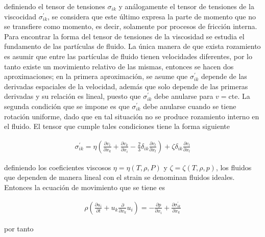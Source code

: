 \noindent definiendo el tensor de tensiones $\sigma_{ik} $ y análogamente el tensor de tensiones de la viscocidad $\sigma^{'}_{ik}$, se considera que este último expresa la parte de momento que no se transfiere como momento, es decir, solamente por procesos de fricción interna. Para encontrar la forma del tensor de tensiones de la viscosidad se estudia el fundamento de las partículas de fluido. La única manera de que exista rozamiento es asumir que entre las partículas de fluido tienen velocidades diferentes, por lo tanto existe un movimiento relativo de las mismas, entonces se hacen dos aproximaciones; en la primera aproximación, se asume que $\sigma^{'}_{ik}$ depende de las derivadas espaciales de la velocidad, además que solo depende de las primeras derivadas y su relación es lineal, puesto que $\sigma^{'}_{ik}$ debe anularse para $v = \text{cte}$. La segunda condición que se impone es que $\sigma^{'}_{ik}$ debe anularse cuando se tiene rotación uniforme, dado que en tal situación no se produce rozamiento interno en el fluido. El tensor que cumple tales condiciones tiene la forma siguiente

\begin{eqnarray}
\sigma^{'}_{ik} = \eta\left(\frac{\partial v_{i}}{\partial x_{k}} + \frac{\partial v_{k}}{\partial x_{i}} - \frac{2}{3}\delta_{ik}\frac{\partial v_{l}}{\partial x_{l}}\right) + \zeta\delta_{ik}\frac{\partial v_{l}}{\partial x_{l}}
\end{eqnarray}

\noindent  definiendo los coeficientes viscosos $\eta = \eta(T,\rho,P)$ y $\zeta=\zeta(T,\rho,p)$, los fluidos que dependen de manera lineal con el strain \cite{Landau} se denominan fluidos ideales. Entonces la ecuación de movimiento que se tiene es

\begin{eqnarray}
\rho\left(\frac{\partial u_{i}}{\partial t} + u_{k}\frac{\partial}{\partial x_{k}}u_{i}\right) = -\frac{\partial p}{\partial x_{i}} + \frac{\partial \sigma^{'}_{ik}}{\partial x_{k}}
\end{eqnarray}

\noindent por tanto

